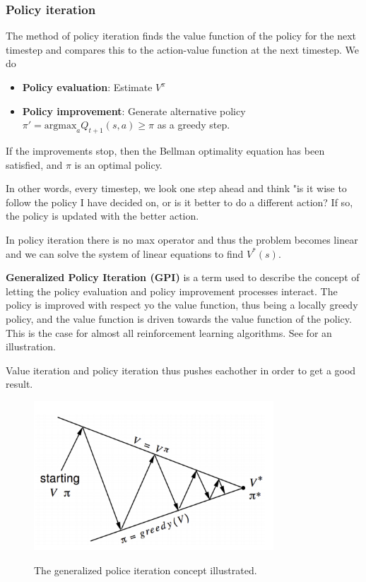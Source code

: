\subsubsection{Policy iteration}

The method of policy iteration finds the value function of the policy for the next timestep and compares this to the action-value function at the next timestep. We do

\begin{itemize}
    \item \textbf{Policy evaluation}: Estimate $V^{\pi}$
    \item \textbf{Policy improvement}: Generate alternative policy $\pi' = \text{argmax}_a Q_{t+1}(s, a) \geq \pi$ as a greedy step.
\end{itemize}

If the improvements stop, then the Bellman optimality equation has been satisfied, and $\pi$ is an optimal policy.

In other words, every timestep, we look one step ahead and think "is it wise to follow the policy I have decided on, or is it better to do a different action? If so, the policy is updated with the better action.

In policy iteration there is no max operator and thus the problem becomes linear and we can solve the system of linear equations to find $V^*(s)$.


\textbf{Generalized Policy Iteration (GPI)} is a term used to describe the concept of letting the policy evaluation and policy improvement processes interact. The policy is improved with respect yo the value function, thus being a locally greedy policy, and the value function is driven towards the value function of the policy. This is the case for almost all reinforcement learning algorithms. See  for an illustration.

Value iteration and policy iteration thus pushes eachother in order to get a good result.


\begin{figure}[h]
    \centering
        \includegraphics[width=0.8\textwidth]{figures/solving/GPI.PNG}\\
        \caption{The generalized police iteration concept illustrated.}
        \label{fig:gpi}
\end{figure}


